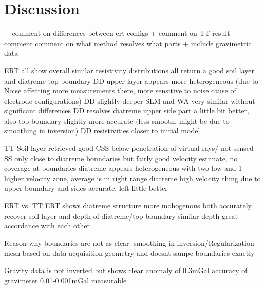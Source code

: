 \section{Discussion}\label{section:Discussion}
+ comment on differences between ert configs
+ comment on TT result
+ comment comment  on what method resolves what parts
+ include gravimetric data 

ERT
all show overall similar resistivity distributions
all return a good soil layer and diatreme top boundary
DD upper layer appears more heterogeneous (due to Noise affecting more measurements there, more sensitive to noise cause of electrode configurations)
DD slightly deeper 
SLM and WA very similar without significant differences
DD resolves diatreme upper side part a little bit better, also top boundary slightly more accurate (less smooth, might be due to smoothing in inversion)
DD resistivities closer to initial model

TT
Soil layer retrieved good
CSS below penetration of virtual rays/ not sensed
SS only close to diatreme boundaries but fairly good velocity estimate, no coverage at boundaries 
diatreme appears heterogeneous with two low and 1 higher velocity zone, average is in right range
diatreme high velocity thing due to 
upper boundary and sides accurate, left little better

ERT vs. TT
ERT shows diatreme structure more mohogenous
both accurately recover soil layer and depth of diatreme/top boundary
similar depth 
great accordance with each other

Reason why boundaries are not as clear:
smoothing in inversion/Regularization
mesh based on data acquisition geometry and doesnt sampe boundaries exactly

Gravity data is not inverted but shows clear anomaly of 0.3mGal
accuracy of gravimeter 0.01-0.001mGal \cite{BGR_grav}
measurable

